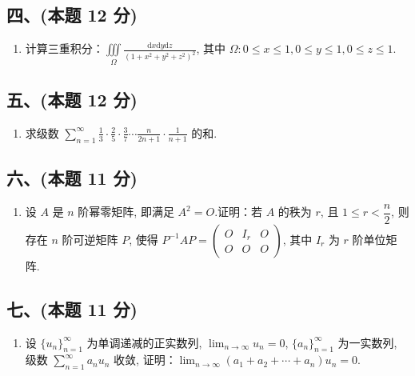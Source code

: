 \subsection*{四、(本题 12 分)}
\begin{enumerate}[start=8]
    \item 计算三重积分：$\displaystyle\iiint\limits_{\Omega} \frac{\mathrm{d}x \mathrm{d}y \mathrm{d}z}{(1 + x^2 + y^2 + z^2)^2}$, 其中 $\Omega: 0 \leqslant x \leqslant 1, 0 \leqslant y \leqslant 1, 0 \leqslant z \leqslant 1$.
\end{enumerate}

\subsection*{五、(本题 12 分)}
\begin{enumerate}[start=9]
    \item 求级数 $\displaystyle\sum_{n=1}^{\infty} \frac{1}{3} \cdot \frac{2}{5} \cdot \frac{3}{7} \cdots \frac{n}{2n+1} \cdot \frac{1}{n+1}$ 的和.
\end{enumerate}

\subsection*{六、(本题 11 分)}
\begin{enumerate}[start=10]
    \item 设 $A$ 是 $n$ 阶幂零矩阵, 即满足 $A^2 = O$.证明：若 $A$ 的秩为 $r$, 且 $1 \leqslant r < \dfrac{n}{2}$, 则存在 $n$ 阶可逆矩阵 $P$, 使得 $P^{-1}AP = \left( \begin{array}{ccc} O & I_r & O \\ O & O & O \end{array} \right)$, 其中 $I_r$ 为 $r$ 阶单位矩阵.
\end{enumerate}

\subsection*{七、(本题 11 分)}
\begin{enumerate}[start=11]
    \item 设 $\{u_n\}_{n=1}^{\infty}$ 为单调递减的正实数列, $\displaystyle\lim_{n \to \infty} u_n = 0$, $\{a_n\}_{n=1}^{\infty}$ 为一实数列, 级数 $\displaystyle\sum_{n=1}^{\infty} a_n u_n$ 收敛, 证明：$\displaystyle\lim_{n \to \infty} (a_1 + a_2 + \cdots + a_n) u_n = 0$.
\end{enumerate}


